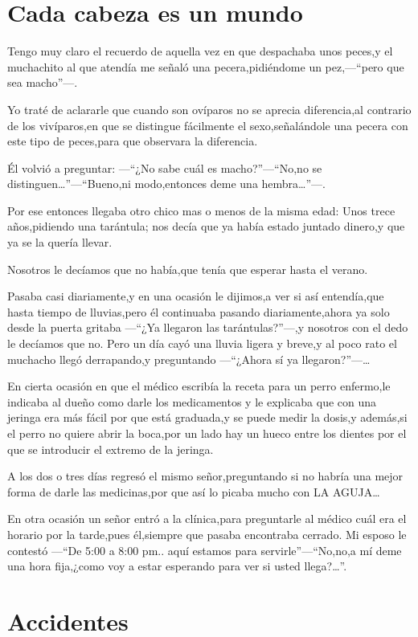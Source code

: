 \documentclass[letterpaper,12pt]{book}
\begin{document}
\chapter{Cada cabeza es un mundo}
Tengo muy claro el recuerdo de aquella vez en que despachaba unos peces,y el muchachito al que atendía me señaló una pecera,pidiéndome un pez,---``pero que sea macho''---.

Yo traté de aclararle que cuando son ovíparos no se aprecia diferencia,al contrario de los vivíparos,en que se distingue fácilmente el sexo,señalándole una pecera con este tipo de peces,para que observara la diferencia.

Él volvió a preguntar: ---``¿No sabe cuál es macho?''---``No,no se distinguen\ldots''---``Bueno,ni modo,entonces deme una hembra\ldots''---.

Por ese entonces llegaba otro chico mas o menos de la misma edad: Unos trece años,pidiendo una tarántula; nos decía que ya había estado juntado dinero,y que ya se la quería llevar.

Nosotros le decíamos que no había,que tenía que esperar hasta el verano.

Pasaba casi diariamente,y en una ocasión le dijimos,a ver si así entendía,que hasta tiempo de lluvias,pero él continuaba pasando diariamente,ahora ya solo desde la puerta gritaba ---``¿Ya llegaron las tarántulas?''---,y nosotros con el dedo le decíamos que no. Pero un día cayó una lluvia ligera y breve,y al poco rato el muchacho llegó derrapando,y preguntando ---``¿Ahora sí ya llegaron?''---\ldots

En cierta ocasión en que el médico escribía la receta para un perro enfermo,le indicaba al dueño como darle los medicamentos y le explicaba que con una jeringa era más fácil por que está graduada,y se puede medir la dosis,y además,si el perro no quiere abrir la boca,por un lado hay un hueco entre los dientes por el que se introducir el extremo de la jeringa.

A los dos o tres días regresó el mismo señor,preguntando si no habría una mejor forma de darle las medicinas,por que así lo picaba mucho con LA AGUJA\ldots

En otra ocasión un señor entró a la clínica,para preguntarle al médico cuál era el horario por la tarde,pues él,siempre que pasaba encontraba cerrado. Mi esposo le contestó ---``De 5:00 a 8:00 pm.. aquí estamos para servirle''---``No,no,a mí deme una hora fija,¿como voy a estar esperando para ver si usted llega?\ldots''.

\chapter{Accidentes}
\end{document}
